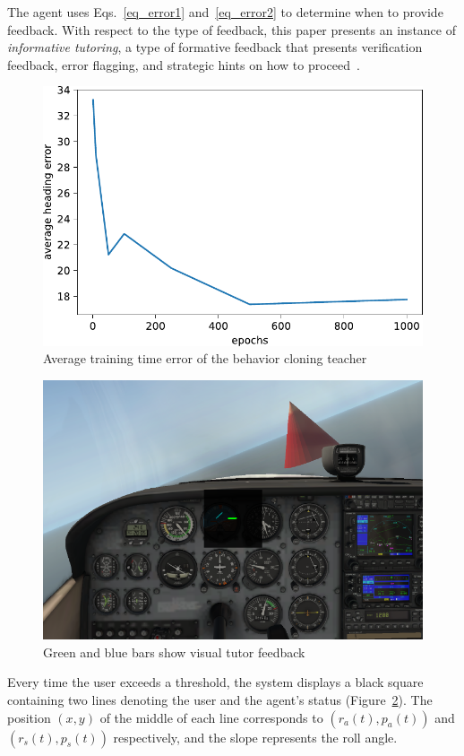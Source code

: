 \documentclass[letterpaper]{article} %
\begin{document}
The agent uses Eqs.~\ref{eq_error1} and~\ref{eq_error2} to determine when to provide feedback. With respect to the type of feedback, this paper presents an instance of \emph{informative tutoring}, a type of formative feedback that presents verification feedback, error flagging, and strategic hints on how to proceed~\citep{shute:08}.
\begin{figure}[t]
	\begin{minipage}{1\linewidth}
		\centering \small
		\includegraphics[width=\textwidth]{img/evaluation.pdf} 
		\caption{Average training time error of the behavior cloning teacher}
		\label{fig:evaluate}
	\end{minipage}
\end{figure}
\begin{figure}[t]
	\begin{minipage}{1\linewidth}
		\centering \small
		\includegraphics[width=\textwidth]{img/feedback.pdf} 
		\caption{Green and blue bars show visual tutor feedback}
		\label{fig:feedback}
	\end{minipage}
\end{figure}
Every time the user exceeds a threshold, the system displays a black square containing two lines denoting the user and the agent's status (Figure~\ref{fig:feedback}). The position $(x,y)$ of the middle of each line corresponds to $(r_a(t), p_a(t))$ and $(r_s(t), p_s(t))$ respectively, and the slope represents the roll angle.
\end{document}
